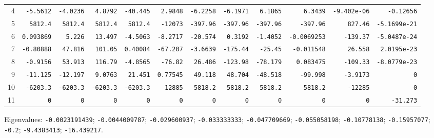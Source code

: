 \begin{landscape}
\begin{tabular}{rrrrrrrrrrrr}
4 & \texttt{-5.5612} & \texttt{-4.0236} & \texttt{4.8792} & \texttt{-40.445} & \texttt{2.9848} & \texttt{-6.2258} & \texttt{-6.1971} & \texttt{6.1865} & \texttt{6.3439} & \texttt{-9.402e-06} & \texttt{-0.12656} \\

5 & \texttt{5812.4} & \texttt{5812.4} & \texttt{5812.4} & \texttt{5812.4} & \texttt{-12073} & \texttt{-397.96} & \texttt{-397.96} & \texttt{-397.96} & \texttt{-397.96} & \texttt{827.46} & \texttt{-5.1699e-21} \\

6 & \texttt{0.093869} & \texttt{5.226} & \texttt{13.497} & \texttt{-4.5063} & \texttt{-8.2717} & \texttt{-20.574} & \texttt{0.3192} & \texttt{-1.4052} & \texttt{-0.0069253} & \texttt{-139.37} & \texttt{-5.0487e-24} \\

7 & \texttt{-0.80888} & \texttt{47.816} & \texttt{101.05} & \texttt{0.40084} & \texttt{-67.207} & \texttt{-3.6639} & \texttt{-175.44} & \texttt{-25.45} & \texttt{-0.011548} & \texttt{26.558} & \texttt{2.0195e-23} \\

8 & \texttt{-0.9156} & \texttt{53.913} & \texttt{116.79} & \texttt{-4.8565} & \texttt{-76.82} & \texttt{26.486} & \texttt{-123.98} & \texttt{-78.179} & \texttt{0.083475} & \texttt{-109.33} & \texttt{-8.0779e-23} \\

9 & \texttt{-11.125} & \texttt{-12.197} & \texttt{9.0763} & \texttt{21.451} & \texttt{0.77545} & \texttt{49.118} & \texttt{48.704} & \texttt{-48.518} & \texttt{-99.998} & \texttt{-3.9173} & \texttt{0} \\

10 & \texttt{-6203.3} & \texttt{-6203.3} & \texttt{-6203.3} & \texttt{-6203.3} & \texttt{12885} & \texttt{5818.2} & \texttt{5818.2} & \texttt{5818.2} & \texttt{5818.2} & \texttt{-12285} & \texttt{0} \\

11 & \texttt{0} & \texttt{0} & \texttt{0} & \texttt{0} & \texttt{0} & \texttt{0} & \texttt{0} & \texttt{0} & \texttt{0} & \texttt{0} & \texttt{-31.273} \\

\bottomrule\end{tabular}\par\endgroup

{\scriptsize Eigenvalues: \texttt{-0.0023191439}; \texttt{-0.0044009787}; \texttt{-0.029600937}; \texttt{-0.033333333}; \texttt{-0.047709669}; \texttt{-0.055058198}; \texttt{-0.10778138}; \texttt{-0.15957077}; \texttt{-0.2}; \texttt{-9.4383413}; \texttt{-16.439217}.\par}


\end{landscape}
